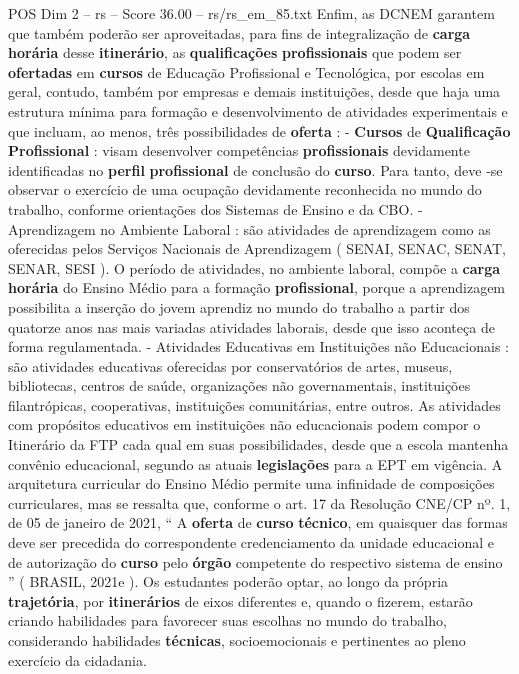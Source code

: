 \begin{textsample}{POS Dim 2 – rs – Score 36.00 – rs/rs\_em\_85.txt}
Enfim, as DCNEM garantem que também poderão ser aproveitadas, para fins de integralização de \textbf{carga} \textbf{horária} desse \textbf{itinerário}, as \textbf{qualificações} \textbf{profissionais} que podem ser \textbf{ofertadas} em \textbf{cursos} de Educação Profissional e Tecnológica, por escolas em geral, contudo, também por empresas e demais instituições, desde que haja uma estrutura mínima para formação e desenvolvimento de atividades experimentais e que incluam, ao menos, três possibilidades de \textbf{oferta} : - \textbf{Cursos} de \textbf{Qualificação} \textbf{Profissional} : visam desenvolver competências \textbf{profissionais} devidamente identificadas no \textbf{perfil} \textbf{profissional} de conclusão do \textbf{curso}.
Para tanto, deve -se observar o exercício de uma ocupação devidamente reconhecida no mundo do trabalho, conforme orientações dos Sistemas de Ensino e da CBO. - Aprendizagem no Ambiente Laboral : são atividades de aprendizagem como as oferecidas pelos Serviços Nacionais de Aprendizagem ( SENAI, SENAC, SENAT, SENAR, SESI ).
O período de atividades, no ambiente laboral, compõe a \textbf{carga} \textbf{horária} do Ensino Médio para a formação \textbf{profissional}, porque a aprendizagem possibilita a inserção do jovem aprendiz no mundo do trabalho a partir dos quatorze anos nas mais variadas atividades laborais, desde que isso aconteça de forma regulamentada. - Atividades Educativas em Instituições não Educacionais : são atividades educativas oferecidas por conservatórios de artes, museus, bibliotecas, centros de saúde, organizações não governamentais, instituições filantrópicas, cooperativas, instituições comunitárias, entre outros.
As atividades com propósitos educativos em instituições não educacionais podem compor o Itinerário da FTP cada qual em suas possibilidades, desde que a escola mantenha convênio educacional, segundo as atuais \textbf{legislações} para a EPT em vigência.
A arquitetura curricular do Ensino Médio permite uma infinidade de composições curriculares, mas se ressalta que, conforme o art. 17 da Resolução CNE/CP nº. 1, de 05 de janeiro de 2021, “ A \textbf{oferta} de \textbf{curso} \textbf{técnico}, em quaisquer das formas deve ser precedida do correspondente credenciamento da unidade educacional e de autorização do \textbf{curso} pelo \textbf{órgão} competente do respectivo sistema de ensino ” ( BRASIL, 2021e ).
Os estudantes poderão optar, ao longo da própria \textbf{trajetória}, por \textbf{itinerários} de eixos diferentes e, quando o fizerem, estarão criando habilidades para favorecer suas escolhas no mundo do trabalho, considerando habilidades \textbf{técnicas}, socioemocionais e pertinentes ao pleno exercício da cidadania.

\end{textsample}
